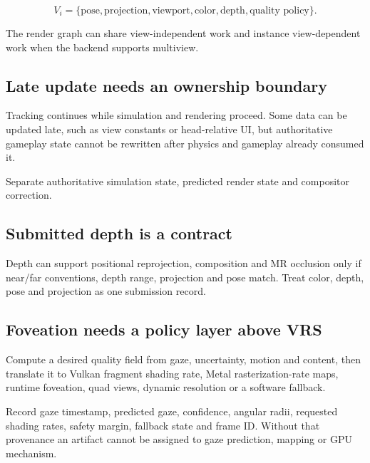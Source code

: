 \[
V_i=\{\text{pose},\text{projection},\text{viewport},
\text{color},\text{depth},\text{quality policy}\}.
\]

The render graph can share view-independent work and instance view-dependent work when the backend supports multiview.

\subsection{Late update needs an ownership boundary}\label{06-engine-ii-ch042-late-update-needs-an-ownership-boundary}

\hypertarget{06-engine-ii-ch042-late-update-needs-an-ownership-boundary}{}

Tracking continues while simulation and rendering proceed. Some data can be updated late, such as view constants or head-relative UI, but authoritative gameplay state cannot be rewritten after physics and gameplay already consumed it.

Separate authoritative simulation state, predicted render state and compositor correction.

\subsection{Submitted depth is a contract}\label{06-engine-ii-ch042-submitted-depth-is-a-contract}

\hypertarget{06-engine-ii-ch042-submitted-depth-is-a-contract}{}

Depth can support positional reprojection, composition and MR occlusion only if near/far conventions, depth range, projection and pose match. Treat color, depth, pose and projection as one submission record.

\subsection{Foveation needs a policy layer above VRS}\label{06-engine-ii-ch042-foveation-needs-a-policy-layer-above-vrs}

\hypertarget{06-engine-ii-ch042-foveation-needs-a-policy-layer-above-vrs}{}

Compute a desired quality field from gaze, uncertainty, motion and content, then translate it to Vulkan fragment shading rate, Metal rasterization-rate maps, runtime foveation, quad views, dynamic resolution or a software fallback.

Record gaze timestamp, predicted gaze, confidence, angular radii, requested shading rates, safety margin, fallback state and frame ID. Without that provenance an artifact cannot be assigned to gaze prediction, mapping or GPU mechanism.

